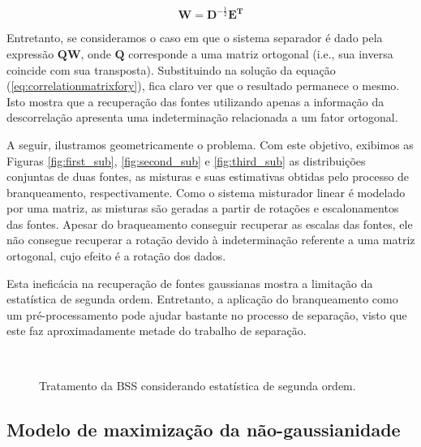     \begin{equation}
        \label{separationmatrixsolution}
        \mathbf{W} = \mathbf{D}^{-\frac{1}{2}}\mathbf{E^T}
    \end{equation}
    
    Entretanto, se consideramos o caso em que o sistema separador é dado pela expressão $\mathbf{QW}$, onde $\mathbf{Q}$ corresponde a uma matriz ortogonal (i.e., sua inversa coincide com sua transposta). Substituindo na solução da equação (\ref{eq:correlationmatrixfory}), fica claro ver que o resultado permanece o mesmo. Isto mostra que a recuperação das fontes utilizando apenas a informação da descorrelação apresenta uma indeterminação relacionada a um fator ortogonal.
    
    A seguir, ilustramos geometricamente o problema. Com este objetivo, exibimos as Figuras \ref{fig:first_sub}, \ref{fig:second_sub} e \ref{fig:third_sub} as distribuições conjuntas de duas fontes, as misturas e suas estimativas obtidas pelo processo de branqueamento, respectivamente. Como o sistema misturador linear é modelado por uma matriz, as misturas são geradas a partir de rotações e escalonamentos das fontes. Apesar do braqueamento conseguir recuperar as escalas das fontes, ele não consegue recuperar a rotação devido à indeterminação referente a uma matriz ortogonal, cujo efeito é a rotação dos dados.
    
    Esta ineficácia na recuperação de fontes gaussianas mostra a limitação da estatística de segunda ordem. Entretanto, a aplicação do branqueamento como um pré-processamento pode ajudar bastante no processo de separação, visto que este faz aproximadamente metade do trabalho de separação.
    
\begin{figure}
    \centering
    \\
    \caption{Tratamento da BSS considerando estatística de segunda ordem.}
    \label{fig:sample_subfigures}
\end{figure}


\subsection{Modelo de maximização da não-gaussianidade}
    
